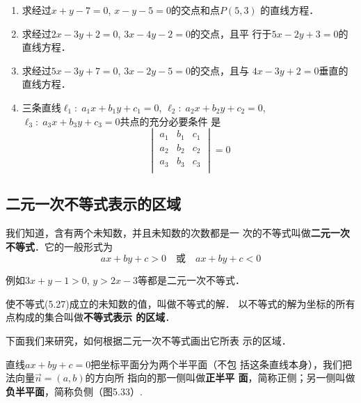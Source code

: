 \begin{ex}
\begin{enumerate}
    \item 求经过$x+y-7=0$, $x-y-5=0$的交点和点$P(5,3)$
    的直线方程．
    \item 求经过$2x-3y+2=0$, $3x-4y-2=0$的交点，且平
    行于$5x-2y+3=0$的直线方程．
    \item 求经过$5x-3y+7=0$, $3x-2y-5=0$的交点，且与
    $4x-3y+2=0$垂直的直线方程．
    \item 三条直线$\ell_1:\; a_1x+b_1y+c_1=0$, $\ell_2:\; a_2x+b_2y+c_2=0$, $\ell_3:\; a_3x+b_3y+c_3=0$共点的充分必要条件
    是
\[\begin{vmatrix}
    a_1&b_1&c_1\\
    a_2&b_2&c_2\\
    a_3&b_3&c_3\\
\end{vmatrix}=0\]
\end{enumerate}
\end{ex}

\subsection{二元一次不等式表示的区域}
我们知道，含有两个未知数，并且未知数的次数都是一
次的不等式叫做\textbf{二元一次不等式}．它的一般形式为
\begin{equation}
    ax+by+c>0\quad \text{或}\quad ax+by+c<0
\end{equation}

例如$3x+y-1>0$, $y>2x-3$等都是二元一次不等式．

使不等式(5.27)成立的未知数的值，叫做不等式的解．
以不等式的解为坐标的所有点构成的集合叫做\textbf{不等式表示
的区域}．

下面我们来研究，如何根据二元一次不等式画出它所表
示的区域．

直线$ax+by+c=0$把坐标平面分为两个半平面（不包
括这条直线本身），我们把
法向量$\vec{n}=(a,b)$的方向所
指向的那一侧叫做\textbf{正半平
面}，简称正侧；另一侧叫做
\textbf{负半平面}，简称负侧（图5.33）.

\begin{figure}[htp]
    \centering
{}
    \caption{}
\end{figure}

